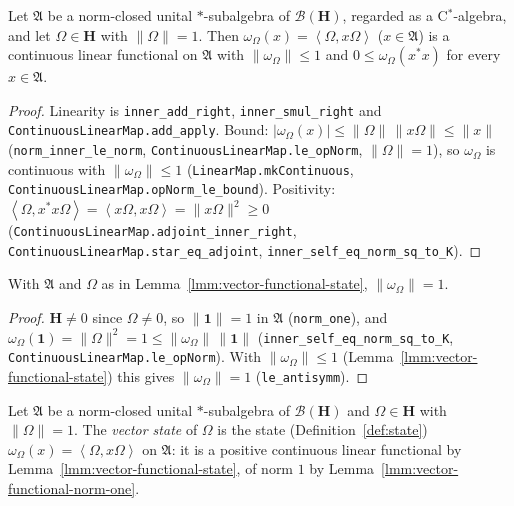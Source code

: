 \begin{lemma}
    \label{lmm:vector-functional-state}
    \leanok
    Let $\mathfrak{A}$ be a norm-closed unital $*$-subalgebra of $\mathcal{B}(\mathbf{H})$, regarded as a C$^*$-algebra, and let $\Omega \in \mathbf{H}$ with $\|\Omega\| = 1$. Then $\omega_\Omega(x) = \left< \Omega, x\Omega \right>$ ($x \in \mathfrak{A}$) is a continuous linear functional on $\mathfrak{A}$ with $\|\omega_\Omega\| \le 1$ and $0 \le \omega_\Omega(x^*x)$ for every $x \in \mathfrak{A}$.
\end{lemma}
\begin{proof}
    \leanok
    Linearity is \texttt{inner\_add\_right}, \texttt{inner\_smul\_right} and \texttt{ContinuousLinearMap.add\_apply}. Bound: $|\omega_\Omega(x)| \le \|\Omega\|\,\|x\Omega\| \le \|x\|$ (\texttt{norm\_inner\_le\_norm}, \texttt{ContinuousLinearMap.le\_opNorm}, $\|\Omega\| = 1$), so $\omega_\Omega$ is continuous with $\|\omega_\Omega\| \le 1$ (\texttt{LinearMap.mkContinuous}, \texttt{ContinuousLinearMap.opNorm\_le\_bound}). Positivity: $\left< \Omega, x^*x\Omega \right> = \left< x\Omega, x\Omega \right> = \|x\Omega\|^2 \ge 0$ (\texttt{ContinuousLinearMap.adjoint\_inner\_right}, \texttt{ContinuousLinearMap.star\_eq\_adjoint}, \texttt{inner\_self\_eq\_norm\_sq\_to\_K}).
\end{proof}

\begin{lemma}
    \label{lmm:vector-functional-norm-one}
    \leanok
    With $\mathfrak{A}$ and $\Omega$ as in Lemma~\ref{lmm:vector-functional-state}, $\|\omega_\Omega\| = 1$.
\end{lemma}
\begin{proof}
    \leanok
    $\mathbf{H} \ne 0$ since $\Omega \ne 0$, so $\|\mathbf{1}\| = 1$ in $\mathfrak{A}$ (\texttt{norm\_one}), and $\omega_\Omega(\mathbf{1}) = \|\Omega\|^2 = 1 \le \|\omega_\Omega\|\,\|\mathbf{1}\|$ (\texttt{inner\_self\_eq\_norm\_sq\_to\_K}, \texttt{ContinuousLinearMap.le\_opNorm}). With $\|\omega_\Omega\| \le 1$ (Lemma~\ref{lmm:vector-functional-state}) this gives $\|\omega_\Omega\| = 1$ (\texttt{le\_antisymm}).
\end{proof}

\begin{definition}
    \label{def:vector-state}
    \leanok
    Let $\mathfrak{A}$ be a norm-closed unital $*$-subalgebra of $\mathcal{B}(\mathbf{H})$ and $\Omega \in \mathbf{H}$ with $\|\Omega\| = 1$. The \emph{vector state} of $\Omega$ is the state (Definition~\ref{def:state}) $\omega_\Omega(x) = \left< \Omega, x\Omega \right>$ on $\mathfrak{A}$: it is a positive continuous linear functional by Lemma~\ref{lmm:vector-functional-state}, of norm $1$ by Lemma~\ref{lmm:vector-functional-norm-one}.
\end{definition}


